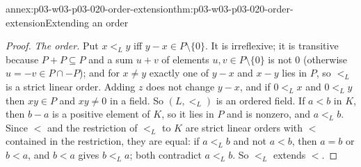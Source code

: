 \begin{annexitem}{annex:p03-w03-p03-020-order-extension}{thm:p03-w03-p03-020-order-extension}{Extending an order}
\begin{proof}
\emph{The order.} Put \(x<_Ly\) iff \(y-x\in P\setminus\{0\}\). It is
irreflexive; it is transitive because \(P+P\subseteq P\) and a sum
\(u+v\) of elements \(u,v\in P\setminus\{0\}\) is not \(0\) (otherwise
\(u=-v\in P\cap-P\)); and for \(x\ne y\) exactly one of \(y-x\) and
\(x-y\) lies in \(P\), so \(<_L\) is a strict linear order. Adding \(z\)
does not change \(y-x\), and if \(0<_Lx\) and \(0<_Ly\) then
\(xy\in P\) and \(xy\ne0\) in a field. So \((L,<_L)\) is an ordered field.
If \(a<b\) in \(K\), then \(b-a\) is a positive element of \(K\), so it lies
in \(P\) and is nonzero, and \(a<_Lb\). Since \(<\) and the restriction of
\(<_L\) to \(K\) are strict linear orders with \(<\) contained in the
restriction, they are equal: if \(a<_Lb\) and not \(a<b\), then \(a=b\) or
\(b<a\), and \(b<a\) gives \(b<_La\); both contradict \(a<_Lb\). So \(<_L\)
extends \(<\).
\end{proof}
\end{annexitem}

